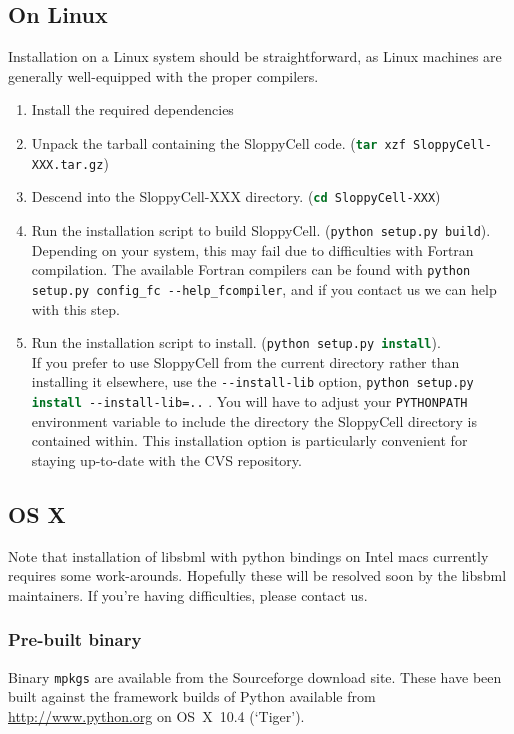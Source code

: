 \documentclass[12pt]{article}
\newcommand{\shell}[1]{\lstinline[language=csh, showstringspaces=False]!#1!}
\begin{document}
\subsection{On Linux}
Installation on a Linux system should be straightforward, as Linux machines are generally well-equipped with the proper compilers.

\begin{enumerate}
\item Install the required dependencies
\item Unpack the tarball containing the SloppyCell code. (\shell{tar xzf SloppyCell-XXX.tar.gz})
\item Descend into the SloppyCell-XXX directory. (\shell{cd SloppyCell-XXX})
\item Run the installation script to build SloppyCell. (\shell{python setup.py build}).\\
Depending on your system, this may fail due to difficulties with Fortran compilation. The available Fortran compilers can be found with  \shell{python setup.py config_fc --help_fcompiler}, and if you contact us we can help with this step.
\item Run the installation script to install. (\shell{python setup.py install}).\\
If you prefer to use SloppyCell from the current directory rather than installing it elsewhere, use the \shell{--install-lib} option, \shell{python setup.py install --install-lib=..} . 
You will have to adjust your \shell{PYTHONPATH} environment variable to include the directory the SloppyCell directory is contained within. 
This installation option is particularly convenient for staying up-to-date with the CVS repository.
\end{enumerate}

\subsection{OS X}
Note that installation of libsbml with python bindings on Intel macs currently requires some work-arounds. Hopefully these will be resolved soon by the libsbml maintainers. If you're having difficulties, please contact us.

\subsubsection{Pre-built binary}
Binary \shell{mpkgs} are available from the Sourceforge download site.
These have been built against the framework builds of Python available from \url{http://www.python.org} on OS~X~10.4 (`Tiger').
\end{document}
